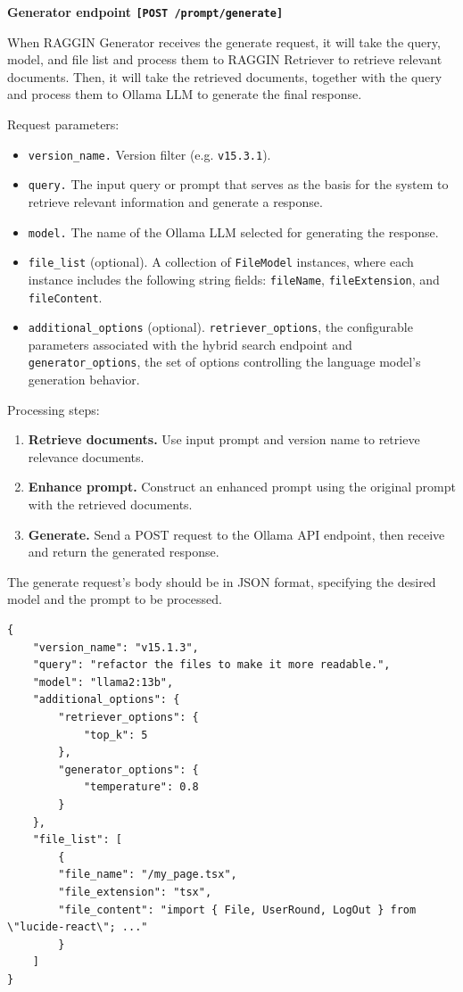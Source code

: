 \textbf{Generator endpoint \texttt{[POST /prompt/generate]}}

When RAGGIN Generator receives the generate request, it will take the query, model, and file list and process them to RAGGIN Retriever to retrieve relevant documents. Then, it will take the retrieved documents, together with the query and process them to Ollama LLM to generate the final response.

Request parameters:
\begin{itemize}
	\item \texttt{version\_name.} Version filter (e.g. \texttt{v15.3.1}).
	\item \texttt{query.} The input query or prompt that serves as the basis for the system to retrieve relevant information and generate a response.
	\item \texttt{model.} The name of the Ollama LLM selected for generating the response.
	\item \texttt{file\_list} (optional). A collection of \texttt{FileModel} instances, where each instance includes the following string fields: \texttt{fileName}, \texttt{fileExtension}, and \texttt{fileContent}.
	\item \texttt{additional\_options} (optional). \texttt{retriever\_options}, the configurable parameters associated with the hybrid search endpoint and \texttt{generator\_options}, the set of options controlling the language model's generation behavior.
	
\end{itemize}

Processing steps:

\begin{enumerate}
	\item \textbf{Retrieve documents.} Use input prompt and version name to retrieve relevance documents.
	\item \textbf{Enhance prompt.} Construct an enhanced prompt using the original prompt with the retrieved documents.
	\item \textbf{Generate.} Send a POST request to the Ollama API endpoint, then receive and return the generated response.

\end{enumerate}

The generate request's body should be in JSON format, specifying the desired model and the prompt to be processed.

\begin{lstlisting}[caption=POST /prompt/generate JSON payload example]
{
    "version_name": "v15.1.3",
    "query": "refactor the files to make it more readable.",
    "model": "llama2:13b",
    "additional_options": {
        "retriever_options": {
        	"top_k": 5
        },
        "generator_options": {
        	"temperature": 0.8
        }
    },
    "file_list": [
        {
        "file_name": "/my_page.tsx",
        "file_extension": "tsx",
        "file_content": "import { File, UserRound, LogOut } from \"lucide-react\"; ..."
        }
    ]
}
\end{lstlisting}

